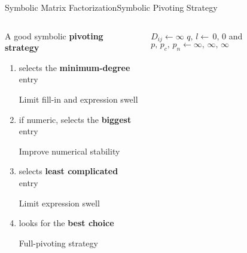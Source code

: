 \begin{frame}{Symbolic Matrix Factorization}{Symbolic Pivoting Strategy}
  \vspace{-1.5em}
  \begin{columns}
    \begin{column}[c]{0.47\textwidth}
      A good symbolic \textbf{pivoting strategy}
      \begin{enumerate}
        \item<1> selects the \textbf{minimum-degree} entry \\
        \begin{small}
          \qquad Limit fill-in and expression swell
        \end{small}
        \item<2> if numeric, selects the \textbf{biggest} entry \\
        \begin{small}
          \qquad Improve numerical stability
        \end{small}
        \item<3> selects \textbf{least complicated} entry \\
        \begin{small}
          \qquad Limit expression swell
        \end{small}
        \item<4> looks for the \textbf{best choice} \\
        \begin{small}
          \qquad Full-pivoting strategy
        \end{small}
      \end{enumerate}
    \end{column}
    \begin{column}[c]{0.53\textwidth}
      \begin{algorithmic}\scriptsize
        \State {}
              \State $D_{ij} \gets \infty$
              {}
            \EndFor
          \EndFor
          \State {}
          \State $q, \, l \gets \, 0, \, 0$  and $p, \, p_c, \, p_n \gets \infty, \, \infty, \, \infty$

\end{algorithmic}
\end{column}
\end{columns}
\end{frame}
